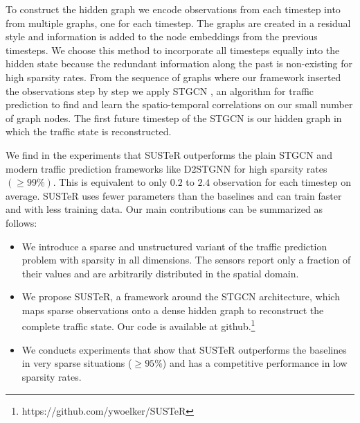 To construct the hidden graph we encode observations from each timestep into from multiple graphs, one for each timestep. 
The graphs are created in a residual style and information is added to the node embeddings from the previous timesteps.
We choose this method to incorporate all timesteps equally into the hidden state because the redundant information along the past is non-existing for high sparsity rates.
From the sequence of graphs where our framework inserted the observations step by step we apply STGCN \cite{Yu18}, an algorithm for traffic prediction to find and learn the spatio-temporal correlations on our small number of graph nodes.
The first future timestep of the STGCN is our hidden graph in which the traffic state is reconstructed. 


We find in the experiments that SUSTeR outperforms the plain STGCN and modern traffic prediction frameworks like D2STGNN for high sparsity rates $(\geq 99\%)$.
This is equivalent to only $0.2$ to $2.4$ observation for each timestep on average.
SUSTeR uses fewer parameters than the baselines and can train faster and with less training data.
Our main contributions can be summarized as follows:
\begin{itemize}
    \item We introduce a sparse and unstructured variant of the traffic prediction problem with sparsity in all dimensions. The sensors report only a fraction of their values and are arbitrarily distributed in the spatial domain.
    \item We propose SUSTeR, a framework around the STGCN architecture, which maps sparse observations onto a dense hidden graph to reconstruct the complete traffic state.
    Our code is available at github.\footnote{https://github.com/ywoelker/SUSTeR}
    \item We conducts experiments that show that SUSTeR outperforms the baselines in very sparse situations ($\geq 95\%$) and has a competitive performance in low sparsity rates.
\end{itemize}
